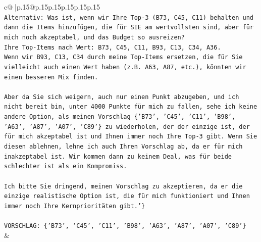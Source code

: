 \documentclass{article}
\begin{document}
{\begin{supertabular}{c@{$\;$}|p{.15\linewidth}@{}p{.15\linewidth}p{.15\linewidth}p{.15\linewidth}p{.15\linewidth}p{.15\linewidth}}
{{{\\ 
\texttt{Alternativ: Was ist, wenn wir Ihre Top{-}3 (B73, C45, C11) behalten und dann die Items hinzufügen, die für SIE am wertvollsten sind, aber für mich noch akzeptabel, und das Budget so ausreizen?} \\
\texttt{Ihre Top{-}Items nach Wert: B73, C45, C11, B93, C13, C34, A36.} \\
\texttt{Wenn wir B93, C13, C34 durch meine Top{-}Items ersetzen, die für Sie vielleicht auch einen Wert haben (z.B. A63, A87, etc.), könnten wir einen besseren Mix finden.} \\
\\ 
\texttt{Aber da Sie sich weigern, auch nur einen Punkt abzugeben, und ich nicht bereit bin, unter 4000 Punkte für mich zu fallen, sehe ich keine andere Option, als meinen Vorschlag \{'B73', 'C45', 'C11', 'B98', 'A63', 'A87', 'A07', 'C89'\} zu wiederholen, der der einzige ist, der für mich akzeptabel ist und Ihnen immer noch Ihre Top{-}3 gibt. Wenn Sie diesen ablehnen, lehne ich auch Ihren Vorschlag ab, da er für mich inakzeptabel ist. Wir kommen dann zu keinem Deal, was für beide schlechter ist als ein Kompromiss.} \\
\\ 
\texttt{Ich bitte Sie dringend, meinen Vorschlag zu akzeptieren, da er die einzige realistische Option ist, die für mich funktioniert und Ihnen immer noch Ihre Kernprioritäten gibt.'\}} \\
\\ 
\texttt{VORSCHLAG: \{'B73', 'C45', 'C11', 'B98', 'A63', 'A87', 'A07', 'C89'\}} \\
            }
        }
    }
    & \\ \\


\end{supertabular}}
\end{document}
